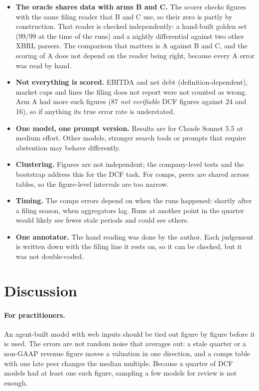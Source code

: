 \documentclass[10pt,a4paper]{article}
\begin{document}
\begin{itemize}
  \item \textbf{The oracle shares data with arms B and C.} The scorer checks figures with the same filing reader that
        B and C use, so their zero is partly by construction. That reader is checked independently: a hand-built
        golden set (99/99 at the time of the runs) and a nightly differential against two other XBRL parsers. The
        comparison that matters is A against B and C, and the scoring of A does not depend on the reader being right,
        because every A error was read by hand.
  \item \textbf{Not everything is scored.} EBITDA and net debt (definition-dependent), market caps and lines the
        filing does not report were not counted as wrong. Arm A had more such figures (87 \emph{not verifiable} DCF
        figures against 24 and 16), so if anything its true error rate is understated.
  \item \textbf{One model, one prompt version.} Results are for Claude Sonnet 5.5 at medium effort. Other models,
        stronger search tools or prompts that require abstention may behave differently.
  \item \textbf{Clustering.} Figures are not independent; the company-level tests and the bootstrap address this for
        the DCF task. For comps, peers are shared across tables, so the figure-level intervals are too narrow.
  \item \textbf{Timing.} The comps errors depend on when the runs happened: shortly after a filing season, when
        aggregators lag. Runs at another point in the quarter would likely see fewer stale periods and could see
        others.
  \item \textbf{One annotator.} The hand reading was done by the author. Each judgement is written down with the
        filing line it rests on, so it can be checked, but it was not double-coded.
\end{itemize}

\section{Discussion}

\paragraph{For practitioners.} An agent-built model with web inputs should be tied out figure by figure before it
is used. The errors are not random noise that averages out: a stale quarter or a non-GAAP revenue figure moves a
valuation in one direction, and a comps table with one late peer changes the median multiple. Because a quarter of
DCF models had at least one such figure, sampling a few models for review is not enough.
\end{document}
